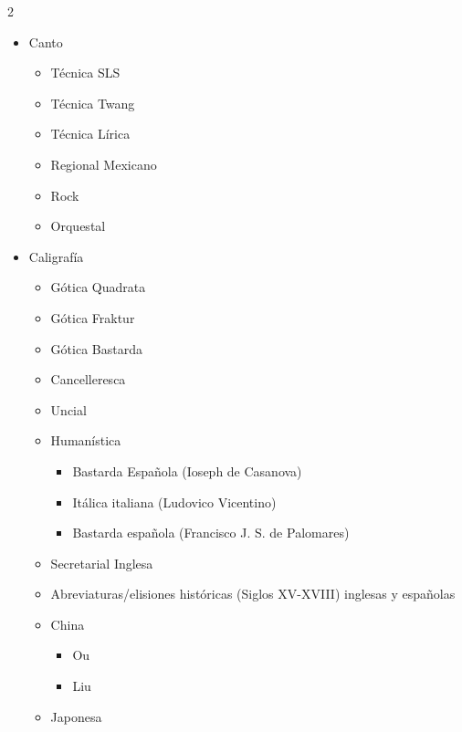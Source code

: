\documentclass[11pt,letterpaper]{article}
\begin{document}
\begin{multicols}{2}
\begin{itemize}[leftmargin=*]
\begin{itemize}
        \item Estructural
        \item Armónico
        \item Melódico
        \item Emocional
        \item Temporal
    \end{itemize}
    \item \colorbox{vinotinto}{\color{white}Canto}
    \begin{itemize}
        \item Técnica SLS
        \item Técnica Twang
        \item Técnica Lírica
        \item Regional Mexicano
        \item Rock
        \item Orquestal
    \end{itemize}
    \item \colorbox{vinotinto}{\color{white}Caligrafía}
    \begin{itemize}
        \item Gótica Quadrata
        \item Gótica Fraktur
        \item Gótica Bastarda
        \item Cancelleresca
        \item Uncial
        \item Humanística
        \begin{itemize}
            \item Bastarda Española (Ioseph de Casanova)
            \item Itálica italiana (Ludovico Vicentino)
            \item Bastarda española (Francisco J. S. de Palomares)
        \end{itemize}
        \columnbreak
        \item Secretarial Inglesa
        \item Abreviaturas/elisiones históricas (Siglos XV-XVIII) inglesas y españolas
        \item China
        \begin{itemize}
            \item Ou
            \item Liu
        \end{itemize}
        \item Japonesa
        \begin{itemize}

\end{itemize}
\end{itemize}
\end{itemize}
\end{multicols}
\end{document}
